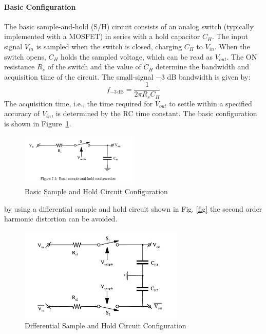 \paragraph{Basic Configuration}
The basic sample-and-hold (S/H) circuit consists of an analog switch (typically implemented with a MOSFET) in series with a hold capacitor $C_H$. The input signal $V_{in}$ is sampled when the switch is closed, charging $C_H$ to $V_{in}$. When the switch opens, $C_H$ holds the sampled voltage, which can be read as $V_{out}$. The ON resistance $R_s$ of the switch and the value of $C_H$ determine the bandwidth and acquisition time of the circuit. The small-signal $-3$ dB bandwidth is given by:
\begin{equation}
    f_{-3\,\mathrm{dB}} = \frac{1}{2\pi R_s C_H}
\end{equation}
The acquisition time, i.e., the time required for $V_{out}$ to settle within a specified accuracy of $V_{in}$, is determined by the RC time constant. The basic configuration is shown in Figure~\ref{fig:basic_sh_config}.
\begin{figure}[h]
    \centering
    \includegraphics[width=0.5\textwidth]{figs/basic_sh_config.png}
    \caption{Basic Sample and Hold Circuit Configuration}
    \label{fig:basic_sh_config}
\end{figure}
by using a differential sample and hold circuit shown in Fig. \ref{fig}
the second order harmonic distortion can be avoided.
\begin{figure}
    \centering
    \includegraphics[width=0.7\textwidth]{figs/differential_sh.png}
    \caption{Differential Sample and Hold Circuit Configuration}
    \label{fig:differential_sh_config}
\end{figure}
